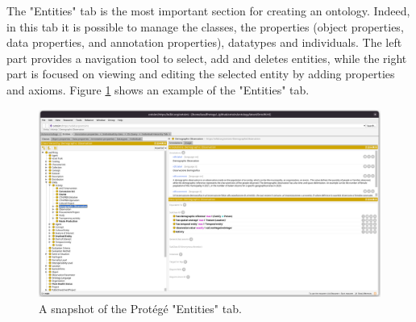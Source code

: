 The "Entities" tab is the most important section for creating an ontology. Indeed, in this tab it is possible to manage the classes, the properties (object properties, data properties, and annotation properties), datatypes and individuals. The left part provides a navigation tool to select, add and deletes entities, while the right part is focused on viewing and editing the selected entity by adding properties and axioms. Figure \ref{fig:protege-entities} shows an example of the "Entities" tab.

\begin{figure}[!ht]
  \centering
  \includegraphics[width=\columnwidth]{images/protege/protege-entities}
  \caption{A snapshot of the Protégé "Entities" tab.}
  \label{fig:protege-entities}
\end{figure}